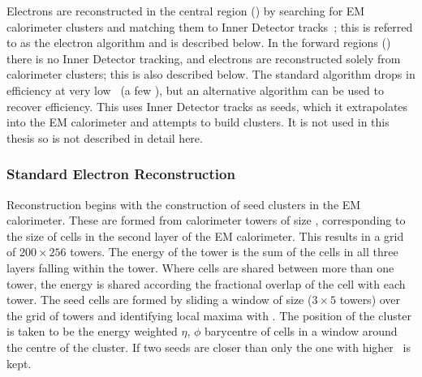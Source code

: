Electrons are reconstructed in the central region () by searching
for EM calorimeter clusters and matching them to Inner Detector
tracks~\cite{ATL-PHYS-PUB-2011-006,Aad:2011mk}; this is
referred to as the  electron algorithm and is described below.
In the forward regions () there is no Inner Detector
tracking, and electrons are reconstructed solely from calorimeter clusters; this
is also described below. The standard algorithm drops in efficiency at very
low \pt\
(a few \gev), but an alternative  algorithm can be used to recover
efficiency. This uses Inner Detector tracks as seeds, which it extrapolates into
the EM calorimeter and attempts to build clusters. It is not used in
this thesis so is not described in detail here.

\subsubsection{Standard Electron Reconstruction}

Reconstruction begins
with the construction of seed clusters in the EM calorimeter. These are formed from
calorimeter towers of size \deltaetadeltaphi{0.025}{0.025}, corresponding to the
size of cells in the second layer of the EM calorimeter. This
results in a grid of $200 \times 256$ towers. The energy
of the tower is the sum of the cells in all three layers
falling within the tower. Where cells are shared between more than one tower, the
energy is shared according the fractional overlap of the cell with each
tower. The seed cells are formed by sliding a
window of size  ($3 \times 5$ towers) over the
grid of towers and identifying local maxima with \etgt{2.5}. The position
of the cluster is taken to be the energy weighted $\eta$, $\phi$ barycentre of
cells in a window around the centre of the cluster. If two seeds are closer than
\deltaetadeltaphi{0.050}{0.050} only the one with higher \et\ is kept.

